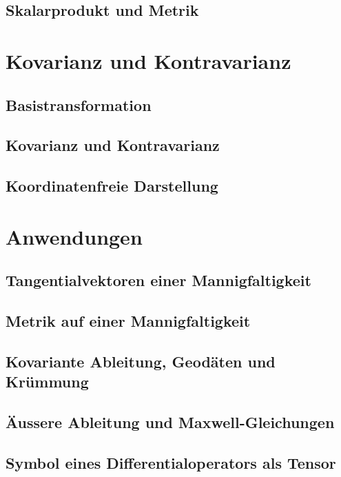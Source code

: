 \subsection{Skalarprodukt und Metrik}

\section{Kovarianz und Kontravarianz}
\subsection{Basistransformation}
\subsection{Kovarianz und Kontravarianz}
\subsection{Koordinatenfreie Darstellung}

\section{Anwendungen}
\subsection{Tangentialvektoren einer Mannigfaltigkeit}
\subsection{Metrik auf einer Mannigfaltigkeit}
\subsection{Kovariante Ableitung, Geodäten und Krümmung}
\subsection{Äussere Ableitung und Maxwell-Gleichungen}
\subsection{Symbol eines Differentialoperators als Tensor}

